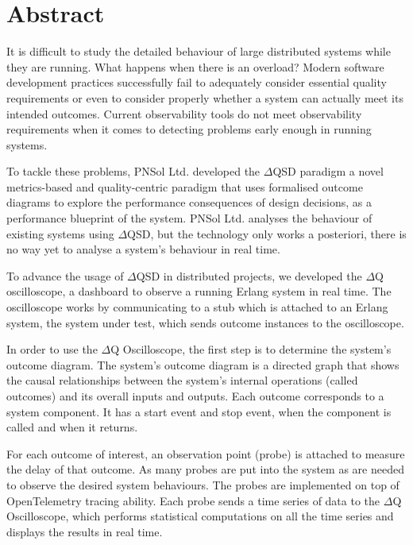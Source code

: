 \chapter*{Abstract}
    It is difficult to study the detailed behaviour of large distributed systems while they are running. What happens when there is an overload? Modern software development practices successfully fail to adequately consider essential quality requirements or even to consider properly whether a system can actually meet its intended outcomes. Current observability tools do not meet observability requirements when it comes to detecting problems early enough in running systems. 

    To tackle these problems, PNSol Ltd. developed the $\Delta$QSD paradigm a novel metrics-based and quality-centric paradigm that uses formalised outcome diagrams to explore the performance consequences of design decisions, as a performance blueprint of the system. PNSol Ltd. analyses the behaviour of existing systems using $\Delta$QSD, but the technology only works a posteriori, there is no way yet to analyse a system’s behaviour in real time. 

    To advance the usage of $\Delta$QSD in distributed projects, we developed the $\Delta$Q oscilloscope, a dashboard to observe a running Erlang system in real time. The oscilloscope works by communicating to a stub which is attached to an Erlang system, the system under test, which sends outcome instances to the oscilloscope. 

In order to use the $\Delta$Q Oscilloscope, the first step is to determine the system's outcome diagram. The system's outcome diagram is a directed graph that shows the causal relationships between the system's internal operations (called outcomes) and its overall inputs and outputs. Each outcome corresponds to a system component. It has a start event and stop event, when the component is called and when it returns.

For each outcome of interest, an observation point (probe) is attached to measure the delay of that outcome. As many probes are put into the system as are needed to observe the desired system behaviours. The probes are implemented on top of OpenTelemetry tracing ability. Each probe sends a time series of data to the $\Delta$Q Oscilloscope, which performs statistical computations on all the time series and displays the results in real time.

